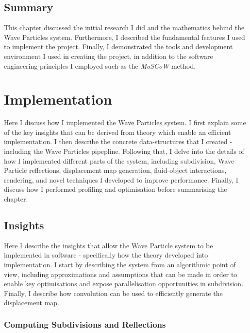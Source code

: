 \documentclass[12pt,a4paper,twoside]{report}
\begin{document}
\section{Summary}

This chapter discussed the initial research I did and the mathematics behind
the Wave Particles system. Furthermore, I described the fundamental features I
used to implement the project. Finally, I demonstrated the tools and
development environment I used in creating the project, in addition to the
software engineering principles I employed such as the \textit{MoSCoW} method.

\chapter{Implementation}



Here I discuss how I implemented the Wave Particles system. I first explain
some of the key insights that can be derived from theory which enable an
efficient implementation. I then describe the concrete data-structures that I
created - including the Wave Particles pipepline. Following that, I delve into
the details of how I implemented different parts of the system, including
subdivision, Wave Particle reflections, displacement map generation,
fluid-object interactions, rendering, and novel techniques I developed to
improve performance. Finally, I discuss how I performed profiling and
optimisation before summarising the chapter.

\section{Insights}

Here I describe the insights that allow the Wave Particle
system to be implemented in software - specifically how the theory developed
into implementation. I start by describing the system from an algorithmic
point of view, including approximations and assumptions that can be made in
order to enable key optimisations and expose parallelisation opportunities in
subdivision. Finally, I describe how convolution can be used to
efficiently generate the displacement map.

\subsection{Computing Subdivisions and Reflections}
\end{document}

